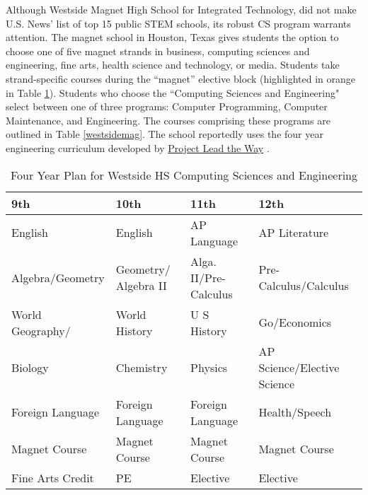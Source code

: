 Although Westside Magnet High School for Integrated Technology, did not make U.S. News' list of top 15 public STEM schools, its robust CS program warrants attention. The magnet school in Houston, Texas gives students the option to choose one of five magnet strands in business, computing sciences and engineering, fine arts, health science and technology, or media. Students take strand-specific courses during the ``magnet'' elective block (highlighted in orange in Table \ref{westsidesched}). Students who choose the ``Computing Sciences and Engineering" select between one of three programs: Computer Programming, Computer Maintenance, and Engineering. The courses comprising these programs are outlined in Table \ref{westsidemag}. The school reportedly uses the four year engineering curriculum developed by \href{https://www.pltw.org/}{Project Lead the Way} \cite{westside}.
\begin{table}[]
\centering
\caption{Four Year Plan for Westside HS Computing Sciences and Engineering \cite{westside}}
\label{westsidesched}
\begin{tabular}{|l|l|l|l|}
	 \hline
\textbf{9th}     & \textbf{10th}        & \textbf{11th}         & \textbf{12th}               \\ \hline
English          & English              & AP Language           & AP Literature               \\ \hline
Algebra/Geometry & Geometry/ Algebra II & Alga. II/Pre-Calculus & Pre-Calculus/Calculus       \\ \hline
World Geography/ & World History        & U S History           & Go/Economics                \\ \hline
Biology          & Chemistry            & Physics               & AP Science/Elective Science \\ \hline
Foreign Language & Foreign Language     & Foreign Language      & Health/Speech               \\ \hline
\rowcolor[HTML]{FFCC67} Magnet Course   & Magnet Course        & Magnet Course         & Magnet Course   \\ \hline
Fine Arts Credit & PE                   & Elective              & Elective					  \\ \hline                   
\end{tabular}
\end{table}


